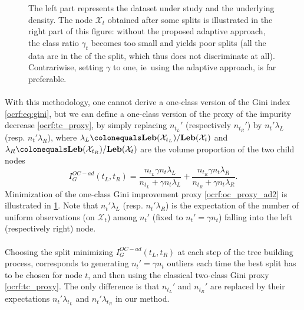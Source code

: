 \begin{figure}[ht!]
{}
\caption[Adaptative splitting criteria]{The left part represents
the dataset under study and the underlying density.  The node $\mathcal{X}_t$
obtained after some splits is illustrated in the right part of this figure:
without the proposed adaptive approach, the class ratio $\gamma_t$ becomes too
small and yields poor splits 
(all the data are in the  of the split, which thus does not
discriminate at all).  Contrariwise, setting $\gamma$ to one, \acs{ie}~using
the adaptive approach, is far preferable.
 \label{ocrf:fig:split_alpha}}
\end{figure}
\paragraph{}
With this methodology, one cannot derive a one-class version of the Gini index
\cref{ocrf:eq:gini}, but we can define a one-class version of the proxy of the
impurity decrease \cref{ocrf:tc_proxy}, by simply replacing $n_{t_L}'$
(respectively $n_{t_R}'$) by $n_t' \lambda_L$ (resp. $n_t' \lambda_R$), where
$\lambda_L \colonequals \Leb(\mathcal{X}_{t_L}) / \Leb(\mathcal{X}_{t})$ and
$\lambda_R \colonequals \Leb(\mathcal{X}_{t_R}) / \Leb(\mathcal{X}_{t})$ are
the volume proportion of the two child nodes
%
\begin{dmath}
    \label{ocrf:oc_proxy_ad2}
    I_G^{OC-ad}(t_L, t_R)= \frac{n_{t_L} \gamma n_t \lambda_L}{n_{t_L} + \gamma
    n_t \lambda_L} + \frac{n_{t_R} \gamma n_t \lambda_R}{n_{t_R} + \gamma n_t
    \lambda_R}.
\end{dmath}
%
Minimization of the one-class Gini improvement proxy \cref{ocrf:oc_proxy_ad2}
is illustrated in \cref{ocrf:fig:split_alpha}.
Note that $n_t'\lambda_L$ (resp. $n_t'\lambda_R$) is the expectation of the
number of uniform  observations (on $\mathcal{X}_t$) among $n_t'$ (fixed to
$n_t' = \gamma n_t$) falling into the left (respectively right) node.
\paragraph{}
Choosing the split minimizing $I_G^{OC-ad}(t_L, t_R)$ at each step of the tree
building process, corresponds to generating $n_t' = \gamma n_t$ outliers each
time the best split has to be chosen for node $t$, and then using the classical
two-class Gini proxy \cref{ocrf:tc_proxy}. The only difference is that
$n_{t_L}'$ and $n_{t_R}'$ are replaced by their expectations
$n_t'\lambda_{t_L}$ and $n_t'\lambda_{t_R}$ in our method.

